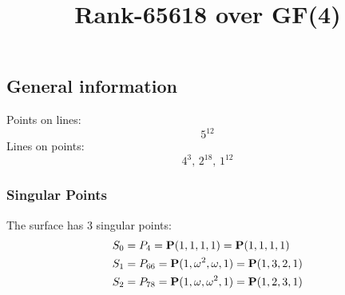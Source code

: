 \documentclass{article}
\newcommand\setTBstruts{\def\T{\rule{0pt}{2.6ex}}%
\def\B{\rule[-1.2ex]{0pt}{0pt}}}
\newcommand{\bP}{{\bf P}}
\begin{document}
 
\setTBstruts



{\allowdisplaybreaks%






\title{Rank-65618 over GF(4)}
\author{}%
\maketitle%
%
{}



\subsection*{General information}
Points on lines:
$$
5^{12}$$
Lines on points:
$$
4^3,\,2^{18},\,1^{12}$$
\subsubsection*{Singular Points}
The surface has 3 singular points:\\
\begin{align*}
S_{0} &= P_{4}=\bP(1, 1, 1, 1) = \bP(1, 1, 1, 1)\\
S_{1} &= P_{66}=\bP(1, \omega^{2}, \omega , 1) = \bP(1, 3, 2, 1)\\
S_{2} &= P_{78}=\bP(1, \omega , \omega^{2}, 1) = \bP(1, 2, 3, 1)\\
\end{align*}
}
\end{document}
